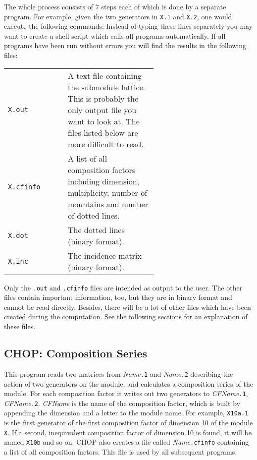 The whole process consists of 7 steps each of which is done by a
separate program. For example, given the two generators in {\tt X.1}
and {\tt X.2}, one would execute the following commands:
Instead of typing these lines separately you may want to
create a shell script which calls all programs automatically. If all
programs have been run without errors you will find the results in the
following files:
\begin{center}
\begin{tabular}{lp{0.6\linewidth}}
{\tt X.out} & A text file containing the submodule lattice. This is
	probably the only output file you want to look at. The files
	listed below are more difficult to read.\\
{\tt X.cfinfo} & A list of all composition factors including
	dimension, multiplicity, number of mountains and number
	of dotted lines.\\
{\tt X.dot} & The dotted lines (binary format).\\
{\tt X.inc} & The incidence matrix (binary format).
\end{tabular}
\end{center}
Only the {\tt .out} and {\tt .cfinfo} files are intended as output to
the user. The other files contain important information, too, but they
are in binary format and cannot be read directly.
Besides, there will be a lot of other files which have been created
during the computation. See the following sections for an explanation
of these files.



\subsection{CHOP: Composition Series}\label{sec:chop}
\Syntax
\msg{chop [-G] [-g {\it NGen}] [-s {\it Start}]
     [-n {\it MaxNul}] [-d {\it MaxDeg}]] {\it Name}}

\Description
This program reads two matrices from {\it Name}{\tt .1} and
{\it Name}{\tt .2} describing the action of two generators on
the module, and calculates a composition series of the module.
For each composition factor it writes out two generators to
{\it CFName}{\tt .1}, {\it CFName}{\tt .2}. {\it CFName} is the
name of the composition factor, which is built by appending the
dimension and a letter to the module name. For example, {\tt X10a.1}
is the first generator of the first composition factor of dimension
10 of the module {\tt X}. If a second, inequivalent composition factor
of dimension 10 is found, it will be named {\tt X10b} and so on.
CHOP also creates a file called {\it Name}{\tt .cfinfo} containing
a list of all composition factors. This file is used by all subsequent
programs.

